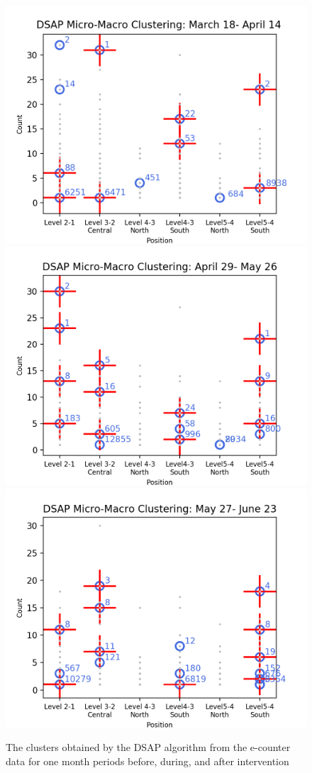 

\begin{figure}[!t]
    \centering
    \includegraphics[width=.47\textwidth]{image/Chapters/Chapter6/BeforeInte1month.png}
    \includegraphics[width=.47\textwidth]{image/Chapters/Chapter6/duringInte1month.png}
    \includegraphics[width=.47\textwidth]{image/Chapters/Chapter6/afterInte1month.png}
    \caption{The clusters obtained by the DSAP algorithm from the e-counter data for one month periods before, during, and after intervention}
    \label{dsap3mon}
\end{figure}

